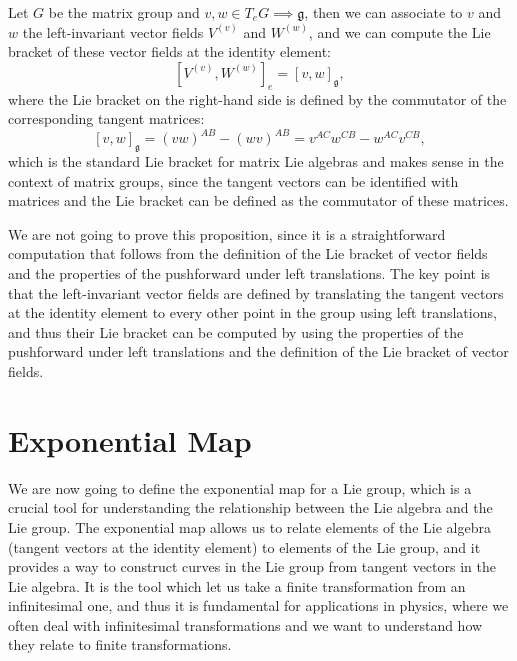 \begin{proposition}
    Let \(G\) be the matrix group and \(v,w \in T_e G \implies \mathfrak{g}\), then we can associate to \(v\) and \(w\) the left-invariant vector fields \(V^{(v)}\) and \(W^{(w)}\), and we can compute the Lie bracket of these vector fields at the identity element:
    \[
        [V^{(v)}, W^{(w)}]_e = [v,w]_\mathfrak{g},
    \]
    where the Lie bracket on the right-hand side is defined by the commutator of the corresponding tangent matrices:
    \[
        [v,w]_\mathfrak{g} = (v w)^{AB} - (w v)^{AB} = v^{AC} w^{CB} - w^{AC} v^{CB},
    \]
    which is the standard Lie bracket for matrix Lie algebras and makes sense in the context of matrix groups, since the tangent vectors can be identified with matrices and the Lie bracket can be defined as the commutator of these matrices.
\end{proposition}

We are not going to prove this proposition, since it is a straightforward computation that follows from the definition of the Lie bracket of vector fields and the properties of the pushforward under left translations. The key point is that the left-invariant vector fields are defined by translating the tangent vectors at the identity element to every other point in the group using left translations, and thus their Lie bracket can be computed by using the properties of the pushforward under left translations and the definition of the Lie bracket of vector fields.

\section{Exponential Map}

We are now going to define the exponential map for a Lie group, which is a crucial tool for understanding the relationship between the Lie algebra and the Lie group. The exponential map allows us to relate elements of the Lie algebra (tangent vectors at the identity element) to elements of the Lie group, and it provides a way to construct curves in the Lie group from tangent vectors in the Lie algebra. It is the tool which let us take a finite transformation from an infinitesimal one, and thus it is fundamental for applications in physics, where we often deal with infinitesimal transformations and we want to understand how they relate to finite transformations.

